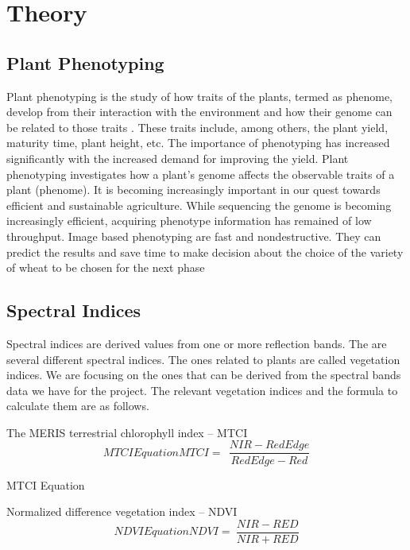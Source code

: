 \documentclass[sigconf, nonacm, natbib, screen, balance=False]{acmart}
\begin{document}
\section{Theory}\label{sec:theory}

\subsection{Plant Phenotyping}\label{sec:plant_pheno}

Plant phenotyping is the study of how traits of the plants, termed as phenome, develop from their interaction with the environment and how their genome can be related to those traits \cite{minervini}. These traits include, among others, the plant yield, maturity time, plant height, etc. The importance of phenotyping has increased significantly with the increased demand for improving the yield.
Plant phenotyping investigates how a plant's genome affects the observable traits of a plant (phenome). It is becoming increasingly important in our quest towards efficient and sustainable agriculture. While sequencing the genome is becoming increasingly efficient, acquiring phenotype information has remained of low throughput. 
Image based phenotyping are fast and nondestructive. They can predict the results and save time to make decision about the choice of the variety of wheat to be chosen for the next phase

\subsection{Spectral Indices}\label{sec:aspect1}

Spectral indices are derived values from one or more reflection bands. The are several different spectral indices. The ones related to plants are called vegetation indices. We are focusing on the ones that can be derived from the spectral bands data we have for the project. The relevant vegetation indices and the formula to calculate them are as follows.

	The MERIS terrestrial chlorophyll index – MTCI
\begin{displaymath}
  \caption{MTCI Equation}
  \label{eq:mtci}
MTCI=\ \ \frac{NIR-RedEdge}{RedEdge-Red}
\end{displaymath}
  \caption{MTCI Equation}

	Normalized difference vegetation index – NDVI
\begin{displaymath}
  \caption{NDVI Equation}
  \label{eq:ndvi}
NDVI=\ \frac{NIR-RED}{NIR+RED}
\end{displaymath}
\end{document}
